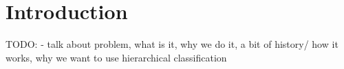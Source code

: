 \section{Introduction}
\label{sec:introduction}

TODO:
 - talk about problem,  what is it, why we do it, a bit of history/ how it works, why we want to use hierarchical classification
 
